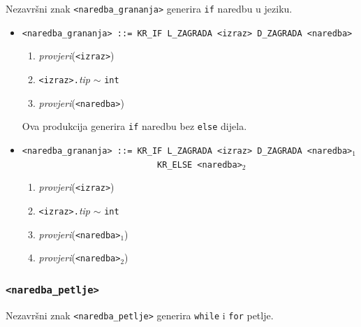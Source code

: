 \documentclass[times, 12pt, utf8]{book}
\begin{document}
Nezavršni znak \verb|<naredba_grananja>| generira \verb|if| naredbu u jeziku.

\begin{itemize}

\item
\verb|<naredba_grananja> ::= KR_IF L_ZAGRADA <izraz> D_ZAGRADA <naredba>|
\begin{enumerate}
\item
\emph{provjeri}(\verb|<izraz>|)
\item
\verb|<izraz>.|\emph{tip} \(\sim\) \verb|int|
\item
\emph{provjeri}(\verb|<naredba>|)
\end{enumerate}

Ova produkcija generira \verb|if| naredbu bez \verb|else| dijela.

\item
\verb|<naredba_grananja> ::= KR_IF L_ZAGRADA <izraz> D_ZAGRADA <naredba>|\(_1\)\\
\verb|                           KR_ELSE <naredba>|\(_2\)
\begin{enumerate}
\item
\emph{provjeri}(\verb|<izraz>|)
\item
\verb|<izraz>.|\emph{tip} \(\sim\) \verb|int|
\item
\emph{provjeri}(\verb|<naredba>|\(_1\))
\item
\emph{provjeri}(\verb|<naredba>|\(_2\))
\end{enumerate}

\end{itemize}

\subsubsection{\texttt{<naredba\_petlje>}}

Nezavršni znak \verb|<naredba_petlje>| generira \verb|while| i \verb|for| petlje.
\end{document}
